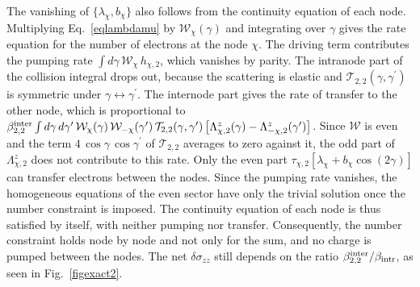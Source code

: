 \documentclass[aps,prb,onecolumn,nofootinbib,citeautoscript,10pt]{revtex4-2}
\begin{document}
The vanishing of $\{\lambda_\chi,b_\chi\}$ also follows from the continuity equation of each node. Multiplying Eq.~\eqref{eqlambdamu} by $\mathcal W_\chi(\gamma)$ and integrating over $\gamma$ gives the rate equation for the number of electrons at the node $\chi$. The driving term contributes the pumping rate $\int d\gamma\,\mathcal W_\chi\,h_{\chi,2}$, which vanishes by parity. The intranode part of the collision integral drops out, because the scattering is elastic and $\mathcal T_{2,2}(\gamma,\gamma^\prime)$ is symmetric under $\gamma\leftrightarrow\gamma^\prime$. The internode part gives the rate of transfer to the other node, which is proportional to $\beta^{\rm inter}_{2,2}\int d\gamma\,d\gamma^\prime\,\mathcal W_\chi(\gamma)\,\mathcal W_{-\chi}(\gamma^\prime)\,\mathcal T_{2,2}(\gamma,\gamma^\prime)\left[\Lambda^z_{\chi,2}(\gamma)-\Lambda^z_{-\chi,2}(\gamma^\prime)\right]$. Since $\mathcal W$ is even and the term $4\,\cos\gamma\,\cos\gamma^\prime$ of $\mathcal T_{2,2}$ averages to zero against it, the odd part of $\Lambda^z_{\chi,2}$ does not contribute to this rate. Only the even part $\tau_{\chi,2}\left[\lambda_\chi+b_\chi\cos(2\gamma)\right]$ can transfer electrons between the nodes. Since the pumping rate vanishes, the homogeneous equations of the even sector have only the trivial solution once the number constraint is imposed. The continuity equation of each node is thus satisfied by itself, with neither pumping nor transfer. Consequently, the number constraint holds node by node and not only for the sum, and no charge is pumped between the nodes. The net $\delta\sigma_{zz}$ still depends on the ratio $\beta^{\rm inter}_{2,2}/\beta_{\rm intr}$, as seen in Fig.~\ref{figexact2}.
\end{document}
